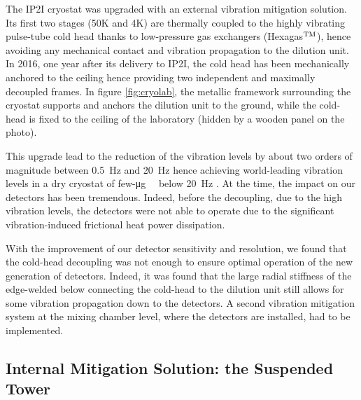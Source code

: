 The IP2I cryostat was upgraded with an external vibration mitigation solution. Its first two stages (50K and 4K) are thermally coupled to the highly vibrating pulse-tube cold head thanks to low-pressure gas exchangers (Hexagas$^{\rm TM}$), hence avoiding any mechanical contact and vibration propagation to the dilution unit. In 2016, one year after its delivery to IP2I, the cold head has been mechanically anchored to the ceiling hence providing two independent and maximally decoupled frames. In figure \ref{fig:cryolab}, the metallic framework surrounding the cryostat supports and anchors the dilution unit to the ground, while the cold-head is fixed to the ceiling of the laboratory (hidden by a wooden panel on the photo).

This upgrade lead to the reduction of the vibration levels by about two orders of magnitude between \SI{0.5}{\Hz} and \SI{20}{\Hz} hence achieving world-leading vibration levels in a dry cryostat of few-\si{\micro g \per \sqrthz} below \SI{20}{\Hz} \cite{Olivieri:2017lqz}.
At the time, the impact on our detectors has been tremendous. Indeed, before the decoupling, due to the high vibration levels, the detectors were not able to operate due to the significant vibration-induced  frictional heat power dissipation. 

With the improvement of our detector sensitivity and resolution, we found that the cold-head decoupling was not enough to ensure optimal operation of the new generation of detectors. Indeed, it was found that the large radial stiffness of the edge-welded below connecting the cold-head to the dilution unit still allows for some vibration propagation down to the detectors. A second vibration mitigation system at the mixing chamber level, where the detectors are installed, had to be implemented.


\subsection{Internal Mitigation Solution: the Suspended Tower}


